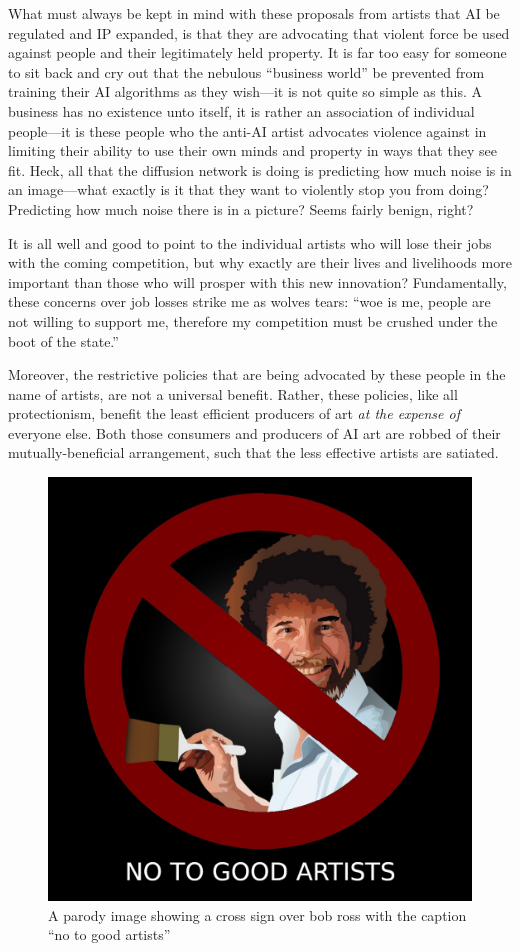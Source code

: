 \documentclass[11pt]{article}
\begin{document}
What must always be kept in mind with these proposals from artists that AI be regulated and IP expanded, is that they are advocating that violent force be used against people and their legitimately held property. It is far too easy for someone to sit back and cry out that the nebulous ``business world'' be prevented from training their AI algorithms as they wish---it is not quite so simple as this. A business has no existence unto itself, it is rather an association of individual people---it is these people who the anti-AI artist advocates violence against in limiting their ability to use their own minds and property in ways that they see fit. Heck, all that the diffusion network is doing is predicting how much noise is in an image---what exactly is it that they want to violently stop you from doing? Predicting how much noise there is in a picture? Seems fairly benign, right?

It is all well and good to point to the individual artists who will lose their jobs with the coming competition, but why exactly are their lives and livelihoods more important than those who will prosper with this new innovation? Fundamentally, these concerns over job losses strike me as wolves tears: ``woe is me, people are not willing to support me, therefore my competition must be crushed under the boot of the state.''

Moreover, the restrictive policies that are being advocated by these people in the name of artists, are not a universal benefit. Rather, these policies, like all protectionism, benefit the least efficient producers of art \emph{at the expense of} everyone else. Both those consumers and producers of AI art are robbed of their mutually-beneficial arrangement, such that the less effective artists are satiated.

\begin{figure}[htbp]
\centering
\includegraphics[width=.9\linewidth]{./images/no-to-good-artists.png}
\caption{A parody image showing a cross sign over bob ross with the caption ``no to good artists''}
\end{figure}
\end{document}
